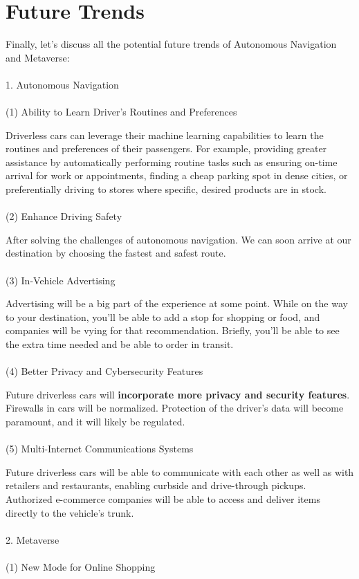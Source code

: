 \section{Future Trends}
Finally, let's discuss all the potential future trends of Autonomous Navigation and Metaverse:
\\\\
1.	Autonomous Navigation \cite{autonomousFuture}
\\\\
(1)	Ability to Learn Driver’s Routines and Preferences

Driverless cars can leverage their machine learning capabilities to learn the routines and preferences of their passengers. For example, providing greater assistance by automatically performing routine tasks such as ensuring on-time arrival for work or appointments, finding a cheap parking spot in dense cities, or preferentially driving to stores where specific, desired products are in stock.
\\\\
(2) Enhance Driving Safety

After solving the challenges of autonomous navigation. We can soon arrive at our destination by choosing the fastest and safest route.
\\\\
(3)	In-Vehicle Advertising

Advertising will be a big part of the experience at some point. While on the way to your destination, you’ll be able to add a stop for shopping or food, and companies will be vying for that recommendation. Briefly, you’ll be able to see the extra time needed and be able to order in transit.
\\\\
(4)	Better Privacy and Cybersecurity Features

Future driverless cars will \textbf{incorporate more privacy and security features}. Firewalls in cars will be normalized. Protection of the driver’s data will become paramount, and it will likely be regulated.
\\\\
(5)	Multi-Internet Communications Systems

Future driverless cars will be able to communicate with each other as well as with retailers and restaurants, enabling curbside and drive-through pickups. Authorized e-commerce companies will be able to access and deliver items directly to the vehicle’s trunk.
\\\\
2.	Metaverse
\\\\
(1)	New Mode for Online Shopping \cite{metaverseFuture1}

